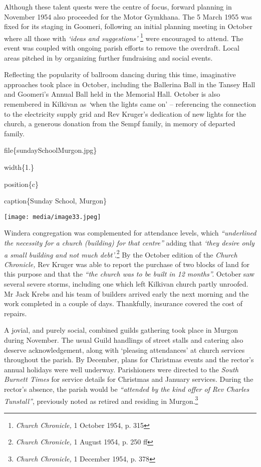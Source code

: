 Although these talent quests were the centre of focus, forward planning in November 1954 also proceeded for the Motor Gymkhana. The 5 March 1955 was fixed for its staging in Goomeri, following an initial planning meeting in October where all those with \emph{`ideas and suggestions'} \footnote{\emph{Church Chronicle,} 1 October 1954, p. 315} were encouraged to attend. The event was coupled with ongoing parish efforts to remove the overdraft. Local areas pitched in by organizing further fundraising and social events.

Reflecting the popularity of ballroom dancing during this time, imaginative approaches took place in October, including the Ballerina Ball in the Tansey Hall and Goomeri's Annual Ball held in the Memorial Hall. October is also remembered in Kilkivan as \emph{`}when the lights came on' -- referencing the connection to the electricity supply grid and Rev Kruger's dedication of new lights for the church, a generous donation from the Sempf family, in memory of departed family.

file\{sundaySchoolMurgon.jpg\}

width\{1.\}

position\{c\}

caption\{Sunday School, Murgon\}

\texttt{[image: media/image33.jpeg]}

Windera congregation was complemented for attendance levels, which \emph{``underlined the necessity for a church (building) for that centre''} adding that \emph{`they desire only a small building and not much debt'}.\footnote{\emph{Church Chronicle,} 1 August 1954, p. 250 ff} By the October edition of the \emph{Church Chronicle,} Rev Kruger was able to report the purchase of two blocks of land for this purpose and that the \emph{``the church was to be built in 12 months''.} October saw several severe storms, including one which left Kilkivan church partly unroofed. Mr Jack Krebs and his team of builders arrived early the next morning and the work completed in a couple of days. Thankfully, insurance covered the cost of repairs.

A jovial, and purely social, combined guilds gathering took place in Murgon during November. The usual Guild handlings of street stalls and catering also deserve acknowledgement, along with `pleasing attendances' at church services throughout the parish. By December, plans for Christmas events and the rector's annual holidays were well underway. Parishioners were directed to the \emph{South Burnett Times} for service details for Christmas and January services. During the rector's absence, the parish would be \emph{``attended by the kind offer of Rev Charles Tunstall''}, previously noted as retired and residing in Murgon.\footnote{\emph{Church Chronicle,} 1 December 1954, p. 378}

